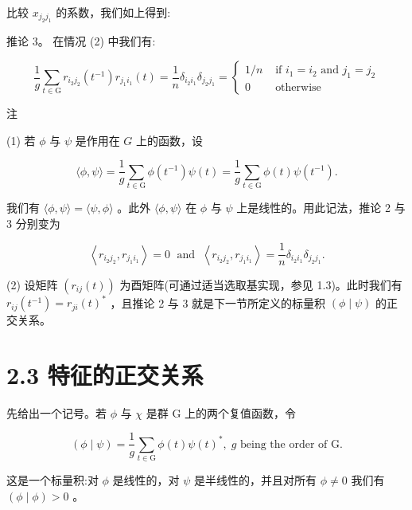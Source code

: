 \documentclass[10pt]{article}
\begin{document}
比较 \({x}_{{j}_{2}{j}_{1}}\) 的系数，我们如上得到:

推论 3。 在情况 (2) 中我们有:

\[
\frac{1}{g}\mathop{\sum }\limits_{{t \in  \mathrm{G}}}{r}_{{i}_{2}{j}_{2}}\left( {t}^{-1}\right) {r}_{{j}_{1}{i}_{1}}\left( t\right)  = \frac{1}{n}{\delta }_{{i}_{2}{i}_{1}}{\delta }_{{j}_{2}{j}_{1}} = \left\{  \begin{array}{ll} 1/n & \text{ if }{i}_{1} = {i}_{2}\text{ and }{j}_{1} = {j}_{2} \\  0 & \text{ otherwise } \end{array}\right.
\]

注

(1) 若 \(\phi\) 与 \(\psi\) 是作用在 \(G\) 上的函数，设

\[
\langle \phi ,\psi \rangle  = \frac{1}{g}\mathop{\sum }\limits_{{t \in  \mathrm{G}}}\phi \left( {t}^{-1}\right) \psi \left( t\right)  = \frac{1}{g}\mathop{\sum }\limits_{{t \in  \mathrm{G}}}\phi \left( t\right) \psi \left( {t}^{-1}\right) .
\]

我们有 \(\langle \phi ,\psi \rangle  = \langle \psi ,\phi \rangle\) 。此外 \(\langle \phi ,\psi \rangle\) 在 \(\phi\) 与 \(\psi\) 上是线性的。用此记法，推论 2 与 3 分别变为

\[
\left\langle  {{r}_{{i}_{2}{j}_{2}},{r}_{{j}_{1}{i}_{1}}}\right\rangle   = 0\;\text{ and }\;\left\langle  {{r}_{{i}_{2}{j}_{2}},{r}_{{j}_{1}{i}_{1}}}\right\rangle   = \frac{1}{n}{\delta }_{{i}_{2}{i}_{1}}{\delta }_{{j}_{2}{j}_{1}}.
\]

(2) 设矩阵 \(\left( {{r}_{ij}\left( t\right) }\right)\) 为酉矩阵(可通过适当选取基实现，参见 1.3)。此时我们有 \({r}_{ij}\left( {t}^{-1}\right)  = {r}_{ji}{\left( t\right) }^{ * }\) ，且推论 2 与 3 就是下一节所定义的标量积 \(\left( {\phi  \mid  \psi }\right)\) 的正交关系。

\section*{2.3 特征的正交关系}

先给出一个记号。若 \(\phi\) 与 \(\chi\) 是群 G 上的两个复值函数，令

\[
\left( {\phi  \mid  \psi }\right)  = \frac{1}{g}\mathop{\sum }\limits_{{t \in  \mathrm{G}}}\phi \left( t\right) \psi {\left( t\right) }^{ * },\;g\text{ being the order of }\mathrm{G}.
\]

这是一个标量积:对 \(\phi\) 是线性的，对 \(\psi\) 是半线性的，并且对所有 \(\phi  \neq  0\) 我们有 \(\left( {\phi  \mid  \phi }\right)  > 0\) 。
\end{document}
